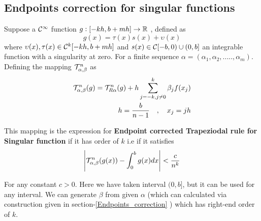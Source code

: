 \documentclass[../document.tex]{subfiles}
\begin{document}
	
	
	
	
	
	
	
	
	\subsection{Endpoints correction for singular functions}
	
	Suppose a $\mathcal{C}^{\infty}$ function $g:[-kh,b+mh]\rightarrow \mathbb{R}$ , defined as
	\begin{equation} \label{singular_func_anguliar1}
		g(x) = 	\tau(x)s(x) + \upsilon(x)
	\end{equation}
	where $\upsilon(x) , \tau(x) \in \mathcal{C}^k[-kh,b+mh]$  and 
	$s(x) \in \mathcal{C}[-b,0)\cup(0, b] $ an integrable function with a singularity at zero.
	For a finite sequence $\alpha = (\alpha_1 ,\alpha_2,.....,\alpha_m)$. Defining the mapping $\mathcal{T}_{\alpha,\beta}^{n}$ as
	\begin{equation} \label{endpoint_singular-trapz-rule}
		\begin{split}
			\mathcal{T}_{\alpha,\beta}^{n} (g)= \mathcal{T}_{R\alpha}^{n} (g) + 
			h\sum_{j=-k,j \neq 0}^{k} \beta_j f(x_j)
			\\
			h = \frac{b}{n-1} \quad,\quad x_j = jh
		\end{split}
	\end{equation}
	
	
	This mapping is the expression for \textbf{Endpoint corrected Trapeziodal rule for Singular function } if it has order of $k$ i.e
	if it satisfies
	\begin{equation}
		\Bigg|	\mathcal{T}_{\alpha,\beta}^{n} (g(x)) - \int_{0}^{b} g(x) dx\Bigg|
		< \frac{c}{n^k}
	\end{equation}
	
	For any constant $c>0$. Here we have taken interval $(0,b]$, but it can be used for any interval. We can generate $\beta$ from given $\alpha$ (which can calculated via construction given in section-\ref{Endpoints_correction} ) which has  right-end order of $k$.
	
	\vspace{1cm}
	
\end{document}
